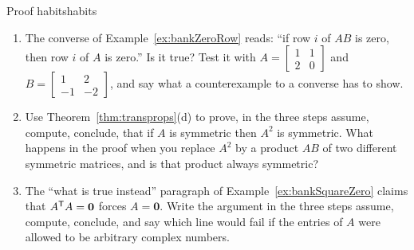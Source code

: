 \documentclass[11pt]{article}
\begin{document}
\begin{think}{Proof habits}{habits}
\begin{enumerate}[label=(\arabic*)]
  \item The converse of Example~\ref{ex:bankZeroRow} reads: ``if row $i$ of $AB$ is zero, then row $i$ of $A$ is zero.'' Is it true? Test it with $A=\begin{bmatrix}1&1\\2&0\end{bmatrix}$ and $B=\begin{bmatrix}1&2\\-1&-2\end{bmatrix}$, and say what a counterexample to a converse has to show.
  \item Use Theorem~\ref{thm:transprops}(d) to prove, in the three steps assume, compute, conclude, that if $A$ is symmetric then $A^2$ is symmetric. What happens in the proof when you replace $A^2$ by a product $AB$ of two different symmetric matrices, and is that product always symmetric?
  \item The ``what is true instead'' paragraph of Example~\ref{ex:bankSquareZero} claims that $A^{\mathsf T} A=\mathbf{0}$ forces $A=\mathbf{0}$. Write the argument in the three steps assume, compute, conclude, and say which line would fail if the entries of $A$ were allowed to be arbitrary complex numbers.
\end{enumerate}
\end{think}
\end{document}
